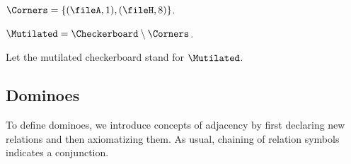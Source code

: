 \begin{forthel}
    \begin{definition}
        $\Corners = \{ (\fileA, 1), (\fileH, 8) \}$.
    \end{definition}

    \begin{definition}
        $\Mutilated = \Checkerboard \setminus \Corners$.
    \end{definition}

    Let the mutilated checkerboard stand for $\Mutilated$.
\end{forthel}



\subsection{Dominoes}

To define dominoes,
we introduce concepts of adjacency by first declaring new relations and then axiomatizing them.
As usual, chaining of relation symbols indicates a conjunction.

